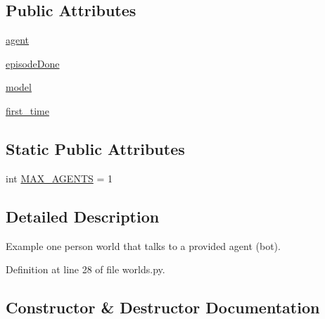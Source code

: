 \subsection*{Public Attributes}
\begin{DoxyCompactItemize}
\item 
\hyperlink{classparlai_1_1chat__service_1_1tasks_1_1chatbot_1_1worlds_1_1MessengerBotChatTaskWorld_aaf90973d4719a52bdf62d221d044399e}{agent}
\item 
\hyperlink{classparlai_1_1chat__service_1_1tasks_1_1chatbot_1_1worlds_1_1MessengerBotChatTaskWorld_a1dd84854cb60115df100f9a5610c4270}{episode\+Done}
\item 
\hyperlink{classparlai_1_1chat__service_1_1tasks_1_1chatbot_1_1worlds_1_1MessengerBotChatTaskWorld_aacaa2c91e062e4c8c2213391a40565f4}{model}
\item 
\hyperlink{classparlai_1_1chat__service_1_1tasks_1_1chatbot_1_1worlds_1_1MessengerBotChatTaskWorld_aeb63eec75493b0fb271a72a6425c81d8}{first\+\_\+time}
\end{DoxyCompactItemize}
\subsection*{Static Public Attributes}
\begin{DoxyCompactItemize}
\item 
int \hyperlink{classparlai_1_1chat__service_1_1tasks_1_1chatbot_1_1worlds_1_1MessengerBotChatTaskWorld_af56dca5416a2dea4ba34feebb5b81ffe}{M\+A\+X\+\_\+\+A\+G\+E\+N\+TS} = 1
\end{DoxyCompactItemize}


\subsection{Detailed Description}
\begin{DoxyVerb}Example one person world that talks to a provided agent (bot).
\end{DoxyVerb}
 

Definition at line 28 of file worlds.\+py.



\subsection{Constructor \& Destructor Documentation}
\mbox{\label{classparlai_1_1chat__service_1_1tasks_1_1chatbot_1_1worlds_1_1MessengerBotChatTaskWorld_a5e7d694f09fe64607a3e0c8b19e5e893}} 
